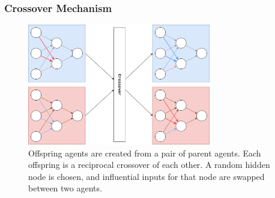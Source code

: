 \documentclass[aspectratio=169]{beamer}
\begin{document}
	\begin{frame}
		\frametitle{Crossover Mechanism}

		\begin{figure}
			\includegraphics[width=80mm]{crossover.png}
			\caption{Offspring agents are created from a pair of parent agents.
			Each offspring is a reciprocal crossover of each other. A random hidden node is chosen, and influential inputs for that node are swapped between two agents.}
		\end{figure}

		\begin{figure}
		\end{figure}
				
	\end{frame}
\end{document}
